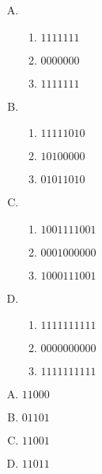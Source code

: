 {{        %
        \begin{practices}
            \begin{enumerate}[A.]
                \item
                \begin{enumerate}[1)]
                    \item $111 1111$
                    \item $000 0000$
                    \item $111 1111$
                \end{enumerate}
                \item
                \begin{enumerate}[1)]
                    \item $1111 1010$
                    \item $1010 0000$
                    \item $0101 1010$
                \end{enumerate}
                \item
                \begin{enumerate}[1)]
                    \item $10 0111 1001$
                    \item $00 0100 0000$
                    \item $10 0011 1001$
                \end{enumerate}
                \item
                \begin{enumerate}[1)]
                    \item $11 1111 1111$
                    \item $00 0000 0000$
                    \item $11 1111 1111$
                \end{enumerate}
            \end{enumerate}
        \end{practices}

        \begin{practices}
            \begin{enumerate}[A.]
                \item $1 1000$
                \item $0 1101$
                \item $1 1001$
                \item $1 1011$
            \end{enumerate}
        \end{practices}

}}
